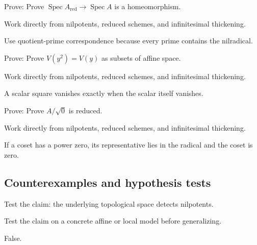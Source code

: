 \begin{exercise}\label{exr:vi10-expand-07}
Prove: Prove $\operatorname{Spec}A_{\mathrm{red}}\to\operatorname{Spec}A$ is a homeomorphism.
\end{exercise}
\begin{hint}
Work directly from nilpotents, reduced schemes, and infinitesimal thickening.
\end{hint}
\begin{solution}
Use quotient-prime correspondence because every prime contains the nilradical.
\end{solution}

\begin{exercise}\label{exr:vi10-expand-08}
Prove: Prove $V(y^2)=V(y)$ as subsets of affine space.
\end{exercise}
\begin{hint}
Work directly from nilpotents, reduced schemes, and infinitesimal thickening.
\end{hint}
\begin{solution}
A scalar square vanishes exactly when the scalar itself vanishes.
\end{solution}

\begin{exercise}\label{exr:vi10-expand-09}
Prove: Prove $A/\sqrt0$ is reduced.
\end{exercise}
\begin{hint}
Work directly from nilpotents, reduced schemes, and infinitesimal thickening.
\end{hint}
\begin{solution}
If a coset has a power zero, its representative lies in the radical and the coset is zero.
\end{solution}

\subsection*{Counterexamples and hypothesis tests}

\begin{exercise}\label{exr:vi10-expand-10}
Test the claim: the underlying topological space detects nilpotents.
\end{exercise}
\begin{hint}
Test the claim on a concrete affine or local model before generalizing.
\end{hint}
\begin{solution}
False.
\end{solution}

